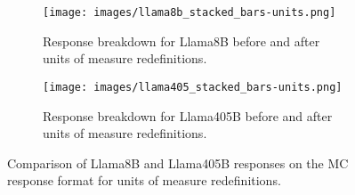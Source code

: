 \begin{figure*}[h]
\begin{subfigure}{\textwidth}
        \centering
         \texttt{[image: images/llama8b\_stacked\_bars-units.png]}
        \caption{Response breakdown for Llama8B before and after units of measure redefinitions.}
        \label{fig:llama8b_MC-units}
    \end{subfigure}
    
    \begin{subfigure}{\textwidth}
        \centering
        \texttt{[image: images/llama405\_stacked\_bars-units.png]}
        \caption{Response breakdown for Llama405B before and after units of measure redefinitions.}
        \label{fig:llama405b_large_MC-units}
    \end{subfigure}
    \caption{Comparison of Llama8B and Llama405B  responses on the MC response format for units of measure redefinitions.}
    \label{fig:llama_all-units}
\end{figure*}
